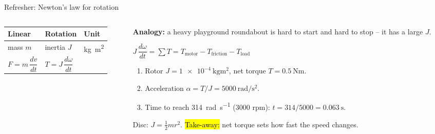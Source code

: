 \documentclass[aspectratio=169,10pt]{beamer}
\begin{document}
\begin{frame}{Refresher: Newton's law for rotation}
\begin{columns}[T]
\begin{column}{.42\textwidth}
\centering
{}

\vspace{1mm}
\small
\renewcommand{\arraystretch}{1.1}
\begin{tabular}{@{}lll@{}}
\toprule
\textbf{Linear} & \textbf{Rotation} & \textbf{Unit}\\
\midrule
mass $m$ & inertia $J$ & \si{\kilo\gram\metre\squared}\\
$F=m\,\dfrac{dv}{dt}$ & $T=J\,\dfrac{d\omega}{dt}$ & \\
\bottomrule
\end{tabular}
\end{column}
\begin{column}{.55\textwidth}
\small
\textbf{Analogy:} a heavy playground roundabout is hard to start and hard to stop -- it has a large  $J$.
\begin{eqbox}
$J\,\dfrac{d\omega}{dt} = \sum T = T_\text{motor} - T_\text{friction} - T_\text{load}$
\end{eqbox}
\begin{defbox}
\small
\begin{enumerate}\setlength\itemsep{1pt}
\item Rotor $J=\SI{1e-4}{\kilo\gram\metre\squared}$, net torque $T=\SI{0.5}{\newton\metre}$.
\item Acceleration $\alpha=T/J=\SI{5000}{\radian\per\second\squared}$.
\item Time to reach \SI{314}{\radian\per\second} (3000 rpm): $t=314/5000=\SI{0.063}{\second}$.
\end{enumerate}
\end{defbox}
Disc: $J=\tfrac12 m r^2$. \hl{Take-away:} net torque sets how fast the speed changes.
\end{column}
\end{columns}
\end{frame}
\end{document}
